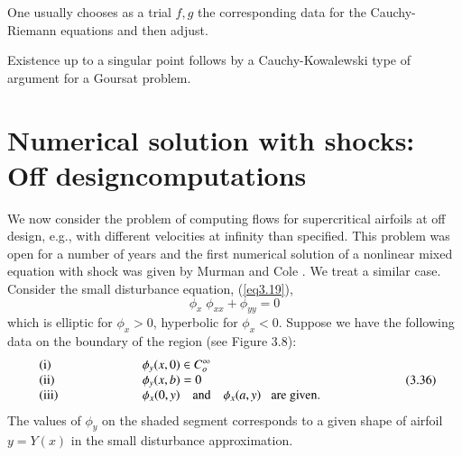 One usually chooses as a trial $f,g$ the corresponding data for the Cauchy-Riemann equations and then adjust.

\begin{remark*}
Existence up to a singular point follows  by a Cauchy-Kowa\-lew\-ski type of argument for a Goursat problem.
\end{remark*}

\section[Numerical solution with shocks: Off...]{Numerical solution
  with shocks: Off design\hfil\break computations}\label{chap3:sec3.12} 
We now consider the problem of computing flows for supercritical airfoils at off design, e.g., with different velocities at infinity than specified. This problem was open for a number of years and the first numerical solution of a nonlinear mixed equation with shock was given by Murman and Cole \cite{key32}. We treat a similar case. Consider the small disturbance equation, (\ref{eq3.19}),
$$
\phi_x \; \phi_{xx} + \phi_{yy} = 0
$$ 
which is elliptic for $\phi_{x} > 0$, hyperbolic for $\phi_x < 0$. Suppose we have the following data on the boundary of the region (see Figure 3.8):
\begin{equation*}
\begin{array}{ll}
{\rm (i)} & \hspace{2cm} \phi_y(x,0) \in C^\infty_o \hspace{2cm}\\
{\rm (ii)} & \hspace{2cm}\phi_y(x,b) = 0 \hspace{2cm}\\
{\rm (iii)} & \hspace{2cm} \phi_x (0,y) \quad \text{and} \quad \phi_x(a,y) \;\; \text{ are given}.  \hspace{1.5cm}
\end{array}\tag{3.36}\label{eq3.36}
\end{equation*}
The values of $\phi_y$ on the shaded segment corresponds to a given shape of airfoil $y = Y(x)$ in the small disturbance approximation.

